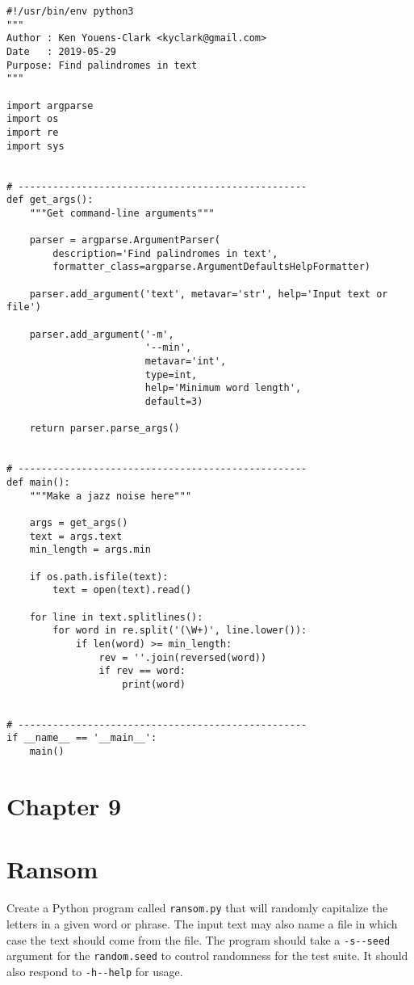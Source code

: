 \documentclass[]{article}
\begin{document}
\begin{verbatim}
#!/usr/bin/env python3
"""
Author : Ken Youens-Clark <kyclark@gmail.com>
Date   : 2019-05-29
Purpose: Find palindromes in text
"""

import argparse
import os
import re
import sys


# --------------------------------------------------
def get_args():
    """Get command-line arguments"""

    parser = argparse.ArgumentParser(
        description='Find palindromes in text',
        formatter_class=argparse.ArgumentDefaultsHelpFormatter)

    parser.add_argument('text', metavar='str', help='Input text or file')

    parser.add_argument('-m',
                        '--min',
                        metavar='int',
                        type=int,
                        help='Minimum word length',
                        default=3)

    return parser.parse_args()


# --------------------------------------------------
def main():
    """Make a jazz noise here"""

    args = get_args()
    text = args.text
    min_length = args.min

    if os.path.isfile(text):
        text = open(text).read()

    for line in text.splitlines():
        for word in re.split('(\W+)', line.lower()):
            if len(word) >= min_length:
                rev = ''.join(reversed(word))
                if rev == word:
                    print(word)


# --------------------------------------------------
if __name__ == '__main__':
    main()
\end{verbatim}

\pagebreak

\hypertarget{chapter-9}{%
\section{Chapter 9}\label{chapter-9}}

\hypertarget{ransom}{%
\section{Ransom}\label{ransom}}

Create a Python program called \texttt{ransom.py} that will randomly
capitalize the letters in a given word or phrase. The input text may
also name a file in which case the text should come from the file. The
program should take a \texttt{-s\textbar{}-\/-seed} argument for the
\texttt{random.seed} to control randomness for the test suite. It should
also respond to \texttt{-h\textbar{}-\/-help} for usage.
\end{document}
